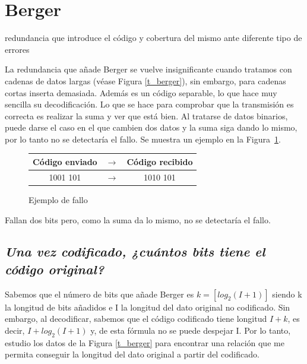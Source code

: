 \documentclass[a4paper]{article}
\begin{document}
\section{Berger}
redundancia que introduce el código y cobertura del mismo ante diferente tipo de errores

	La redundancia que añade Berger se vuelve insignificante cuando tratamos con cadenas de datos largas (véase Figura \ref{t_berger}), sin embargo, para cadenas cortas inserta demasiada. Además es un código separable, lo que hace muy sencilla su decodificación.
	Lo que se hace para comprobar que la transmisión es correcta es realizar la suma y ver que está bien. Al tratarse de datos binarios, puede darse el caso en el que cambien dos datos y la suma siga dando lo mismo, por lo tanto no se detectaría el fallo. Se muestra un ejemplo en la Figura~\ref{ej_berger}.
	\begin{figure}[h!]
		\centering
		\begin{tabular}{| c | c | c |}
				
			\hline
			
			Código enviado & $\rightarrow$ & Código recibido \\
			\hline
			\rowcolor{LightCyan}
			1001 101 & $\rightarrow$ & 1010 101 \\ 
			\hline
				
		\end{tabular}

		\label{ej_berger}
		\caption{Ejemplo de fallo}
	\end{figure}
	Fallan dos bits pero, como la suma da lo mismo, no se detectaría el fallo.
	\subsection{\emph{Una vez codificado, ¿cuántos bits tiene el código original?}}
	Sabemos que el número de bits que añade Berger es $k = [log_2(I+1)]$ siendo k la longitud de bits añadidos e I la longitud del dato original no codificado. Sin embargo, al decodificar, sabemos que el código codificado tiene longitud $I + k$, es decir, $I + log_2(I+1)$ y, de esta fórmula no se puede despejar I. 
	Por lo tanto, estudio los datos de la Figura \ref{t_berger} para encontrar una relación que me permita conseguir la longitud del dato original a partir del codificado.
	
\end{document}

